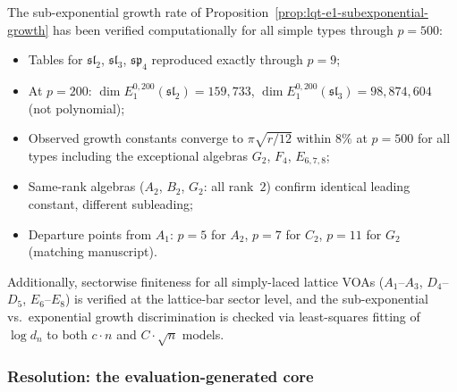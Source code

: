 \begin{remark}
\begin{computation}
\label{comp:lqt-e1-growth-verification}
The sub-exponential growth rate of
Proposition~\ref{prop:lqt-e1-subexponential-growth} has been
verified computationally
for all
simple types through $p = 500$:
\begin{itemize}
\item Tables for $\mathfrak{sl}_2$, $\mathfrak{sl}_3$,
  $\mathfrak{sp}_4$ reproduced exactly through $p = 9$;
\item At $p = 200$: $\dim E_1^{0,200}(\mathfrak{sl}_2) = 159{,}733$,
  $\dim E_1^{0,200}(\mathfrak{sl}_3) = 98{,}874{,}604$
  (not polynomial);
\item Observed growth constants converge to $\pi\sqrt{r/12}$
  within $8\%$ at $p = 500$ for all types including the
  exceptional algebras $G_2$, $F_4$, $E_{6,7,8}$;
\item Same-rank algebras ($A_2$, $B_2$, $G_2$: all rank~$2$)
  confirm identical leading constant, different subleading;
\item Departure points from $A_1$: $p = 5$ for $A_2$,
  $p = 7$ for $C_2$, $p = 11$ for $G_2$ (matching manuscript).
\end{itemize}
Additionally, sectorwise finiteness for all simply-laced lattice
VOAs ($A_1$--$A_3$, $D_4$--$D_5$, $E_6$--$E_8$) is verified at the
lattice-bar sector level,
and the sub-exponential vs.\ exponential growth discrimination is
checked via least-squares fitting of $\log d_n$ to both $c \cdot n$
and $C \cdot \sqrt{n}$ models.
\end{computation}

\end{remark}

\subsubsection*{Resolution: the evaluation-generated core}

